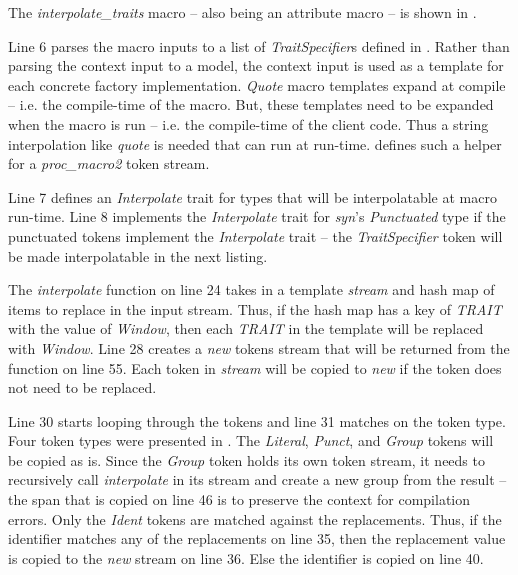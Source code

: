 The \textit{interpolate\_traits} macro -- also being an attribute macro -- is shown in .


Line 6 parses the macro inputs to a list of \textit{TraitSpecifier}s defined in .
Rather than parsing the context input to a model, the context input is used as a template for each concrete factory implementation.
\textit{Quote} macro templates expand at compile -- i.e. the compile-time of the macro.
But, these templates need to be expanded when the macro is run -- i.e. the compile-time of the client code.
Thus a string interpolation like \textit{quote} is needed that can run at run-time.
 defines such a helper for a \textit{proc\_macro2} token stream.


Line 7 defines an \textit{Interpolate} trait for types that will be interpolatable at macro run-time.
Line 8 implements the \textit{Interpolate} trait for \textit{syn}'s \textit{Punctuated} type if the punctuated tokens implement the \textit{Interpolate} trait -- the \textit{TraitSpecifier} token will be made interpolatable in the next listing.

The \textit{interpolate} function on line 24 takes in a template \textit{stream} and hash map of items to replace in the input stream.
Thus, if the hash map has a key of \textit{TRAIT} with the value of \textit{Window}, then each \textit{TRAIT} in the template will be replaced with \textit{Window}.
Line 28 creates a \textit{new} tokens stream that will be returned from the function on line 55.
Each token in \textit{stream} will be copied to \textit{new} if the token does not need to be replaced.

Line 30 starts looping through the tokens and line 31 matches on the token type.
Four token types were presented in .
The \textit{Literal}, \textit{Punct}, and \textit{Group} tokens will be copied as is.
Since the \textit{Group} token holds its own token stream, it needs to recursively call \textit{interpolate} in its stream and create a new group from the result -- the span that is copied on line 46 is to preserve the context for compilation errors.
Only the \textit{Ident} tokens are matched against the replacements.
Thus, if the identifier matches any of the replacements on line 35, then the replacement value is copied to the \textit{new} stream on line 36.
Else the identifier is copied on line 40.

